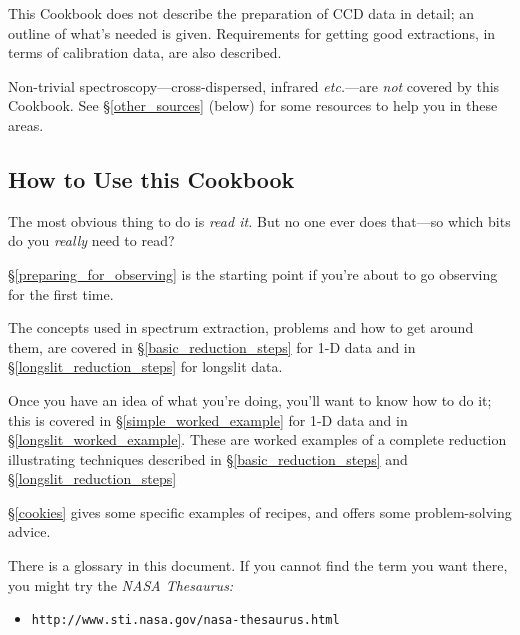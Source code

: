 \documentclass[twoside,11pt]{article}
\newcommand{\htmladdnormallink}[2]{#1}
\newcommand{\htmlref}[2]{#1}
\newcommand{\xlabel}[1]{}
\newcommand{\mlabel}[1]{\xlabel{#1}\label{#1}}
\newcommand{\scspec}[2]{#1}
\newcommand{\scspec}[2]{#2}
\begin{document}
This Cookbook does not describe the preparation of CCD data in detail;
an outline of what's needed is given.  Requirements for getting good
extractions, in terms of calibration data, are also described.

Non-trivial spectroscopy\scspec{---}{ - }cross-dispersed, infrared
{\it{etc.}}\scspec{---}{ - }are {\em not} covered by this Cookbook.
See \scspec{\S\ref{other_sources} (below)}{\htmlref{Other Sources of
Information}{other_sources}} for some resources to help you in these
areas.


\subsection{\mlabel{how_to_use}How to Use this Cookbook}

The most obvious thing to do is {\em read it.}  But no one ever
does that\scspec{---}{ - }so which bits do you {\em really} need to read?

\scspec{\S\ref{preparing_for_observing}}{\htmlref{Preparing for
Observing}{preparing_for_observing}} is the starting point if you're
about to go observing for the first time.

The concepts used in spectrum extraction, problems and how to get
around them, are covered in \scspec{\S\ref{basic_reduction_steps}}
{\htmlref{Basic Steps}{basic_reduction_steps}} for 1-D data and in
\scspec{\S\ref{longslit_reduction_steps}} {\htmlref{Longslit
reduction}{longslit_reduction_steps}} for longslit data. 

Once you have an idea of what you're doing, you'll want to know how to
do it; this is covered in \scspec{\S\ref{simple_worked_example}}
{\htmlref{A Worked Example}{simple_worked_example}} for 1-D data and
in \scspec{\S\ref{longslit_worked_example}} {\htmlref{A 2-D Worked
Example}{longslit_worked_example}}. These are worked examples of a
complete reduction illustrating techniques described in
\scspec{\S\ref{basic_reduction_steps}}{\htmlref{Basic Steps}
{basic_reduction_steps}} and \scspec{\S\ref{longslit_reduction_steps}}
{\htmlref{Longslit reduction}{longslit_reduction_steps}}

\scspec{\S\ref{cookies}}{The \htmlref{Cookies}{cookies} section} gives
some specific examples of recipes, and offers some problem-solving advice.

There is a \htmlref{glossary}{glossary} in this document.
If you cannot find the term you want there, you might try the
{\sl NASA Thesaurus:}

\begin{itemize}

\item \scspec{{\tt http://www.sti.nasa.gov/nasa-thesaurus.html}}
      {\htmladdnormallink{\verb+http://www.sti.nasa.gov/nasa-thesaurus.html+}
      {http://www.sti.nasa.gov/nasa-thesaurus.html}}

\end{itemize}
\end{document}
